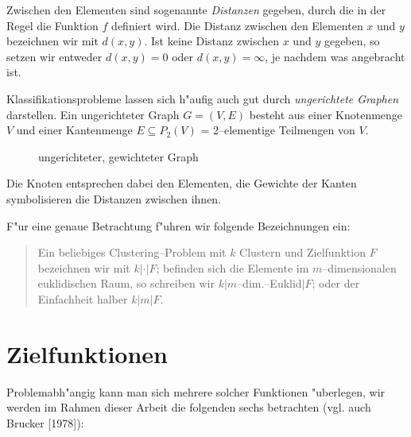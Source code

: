 Zwischen den Elementen sind sogenannte {\em Distanzen} gegeben, durch 
die in der Regel die Funktion $f$ definiert wird. Die Distanz
zwischen den Elementen $x$ und $y$ bezeichnen wir mit $d(x,y)$. 
Ist keine Distanz zwischen $x$ und $y$ gegeben, so setzen wir
entweder $d(x,y) = 0$ oder $d(x,y) = \infty$, je nachdem was
angebracht ist.

Klassifikationsprobleme lassen sich h"aufig auch gut durch 
{\em ungerichtete Graphen} darstellen. Ein ungerichteter Graph $G=(V,E)$ 
besteht aus einer Knotenmenge $V$ und einer Kantenmenge $E \subseteq
P_2(V)$ = 2--elementige Teilmengen von $V$.

\begin{figure}[htbp]
\begin{center}

\end{center}
\caption{ungerichteter, gewichteter Graph}
\end{figure}

Die Knoten entsprechen dabei den Elementen, die Gewichte der 
Kanten symbolisieren die Distanzen zwischen ihnen.

\begin{bezeichnung}
F"ur eine genaue Betrachtung f"uhren wir folgende Bezeichnungen ein:
\begin{quote}
	Ein beliebiges Clustering--Problem mit $k$ Clustern und Zielfunktion $F$
	bezeichnen wir mit $k|\cdot|F$; befinden sich die Elemente im 
	$m$--di\-men\-sio\-na\-len euklidischen Raum, so schreiben wir
	$k|m$--dim.--Euklid$|F$; oder der Einfachheit halber $k|m|F$.
\end{quote}
\end{bezeichnung}

\section{Zielfunktionen}
\label{zielfunktionen}
\label{zielfunktionenkapitel}
Problemabh"angig kann man sich mehrere solcher Funktionen "uberlegen,
wir werden im Rahmen dieser Arbeit die folgenden sechs betrachten 
(vgl. auch Brucker [1978]):

